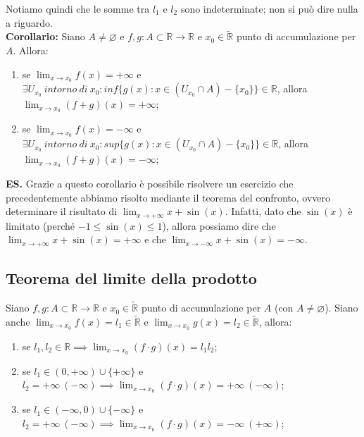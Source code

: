 \documentclass{article}
\begin{document}
\noindent Notiamo quindi che le somme tra $l_1$ e $l_2$ sono indeterminate; non si può dire nulla a riguardo.\\

\noindent\textbf{Corollario:} Siano $A \neq \varnothing$ e $f,g: A \subset \mathbb{R} \xrightarrow{} \mathbb{R}$ e $x_0 \in \widetilde{\mathbb{R}}$ punto di accumulazione per $A$. Allora:

\begin{enumerate}[label=\alph{enumi})]
    \item se $\lim_{x \to x_0} f(x) = +\infty$ e $\exists U_{x_0} \ intorno \ di \ x_0 : inf\{g(x) : x \in (U_{x_0} \cap A) - \{x_0\}\} \in \mathbb{R}$, allora $\lim_{x \to x_0} (f + g)(x) = + \infty$;
    \item se $\lim_{x \to x_0} f(x) = -\infty$ e $\exists U_{x_0} \ intorno \ di \ x_0 : sup\{g(x) : x \in (U_{x_0} \cap A) - \{x_0\}\} \in \mathbb{R}$, allora $\lim_{x \to x_0} (f + g)(x) = - \infty$;
\end{enumerate}

\noindent\textbf{ES.} Grazie a questo corollario è possibile risolvere un esercizio che precedentemente abbiamo risolto mediante il teorema del confronto, ovvero determinare il risultato di $\lim_{x \to +\infty} x + \sin(x)$. Infatti, dato che $\sin(x)$ è limitato (perché $-1 \leq \sin(x) \leq 1$), allora possiamo dire che $\lim_{x \to + \infty} x + \sin(x) = +\infty$ e che $\lim_{x \to -\infty} x + \sin(x) = -\infty$.

\subsection{Teorema del limite della prodotto}
 Siano $f, g: A \subset \mathbb{R} \xrightarrow{} \mathbb{R}$ e $x_0 \in \widetilde{\mathbb{R}}$ punto di accumulazione per $A$ (con $A \neq \varnothing$). Siano anche $\lim_{x \to x_0} f(x) = l_1 \in \widetilde{\mathbb{R}}$ e $\lim_{x \to x_0} g(x) = l_2 \in \widetilde{\mathbb{R}}$, allora:

\begin{enumerate}[label=\alph{enumi})]
    \item se $l_1, l_2 \in \mathbb{R} \implies \lim_{x \to x_0} (f \cdot g)(x) = l_1l_2$;
    \item se $l_1 \in (0, +\infty) \cup \{+\infty\}$ e $l_2 = +\infty \ (- \infty) \implies \lim_{x \to x_0} (f\cdot g)(x) = +\infty \ (-\infty)$;
    \item se $l_1 \in (-\infty, 0) \cup \{-\infty\}$ e $l_2 = +\infty \ (- \infty) \implies \lim_{x \to x_0} (f\cdot g)(x) = -\infty \ (+\infty)$;
\end{enumerate}
\end{document}
